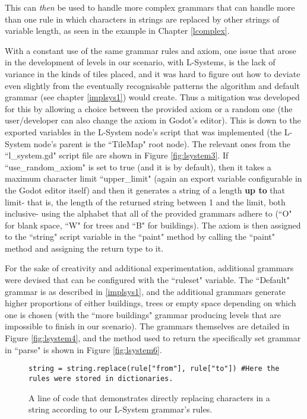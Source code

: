 This can \textit{then} be used to handle more complex grammars that can handle more than one rule in which characters in strings are replaced by other strings of variable length, as seen in the example in Chapter \ref{lcomplex}.

With a constant use of the same grammar rules and axiom, one issue that arose in the development of levels in our scenario, with L-Systems, is the lack of variance in the kinds of tiles placed, and it was hard to figure out how to deviate even slightly from the eventually recognisable patterns the algorithm and default grammar (see chapter \ref{implsys1}) would create. Thus a mitigation was developed for this by allowing a choice between the provided axiom or a random one (the user/developer can also change the axiom in Godot's editor). This is down to the exported variables in the L-System node's script that was implemented (the L-System node's parent is the ``TileMap" root node). The relevant ones from the ``l\_system.gd" script file are shown in Figure \ref{fig:lsystem3}. If ``use\_random\_axiom" is set to true (and it is by default), then it takes a maximum character limit ``upper\_limit" (again an export variable configurable in the Godot editor itself) and then it generates a string of a length \textbf{up to} that limit- that is, the length of the returned string between 1 and the limit, both inclusive- using the alphabet that all of the provided grammars adhere to (``O" for blank space, ``W" for trees and ``B" for buildings). The axiom is then assigned to the ``string" script variable in the ``paint" method by calling the ``paint" method and assigning the return type to it.

For the sake of creativity and additional experimentation, additional grammars were devised that can be configured with the ``ruleset" variable. The ``Default" grammar is as described in \ref{implsys1}, and the additional grammars generate higher proportions of either buildings, trees or empty space depending on which one is chosen (with the ``more buildings" grammar producing levels that are impossible to finish in our scenario). The grammars themselves are detailed in Figure \ref{fig:lsystem4}, and the method used to return the specifically set grammar in ``parse" is shown in Figure \ref{fig:lsystem6}.

\begin{figure}[H]
    \centering
    \begin{lstlisting}
string = string.replace(rule["from"], rule["to"]) #Here the rules were stored in dictionaries.
    \end{lstlisting}
    \caption{A line of code that demonstrates directly replacing characters in a string according to our L-System grammar's rules.}
    \label{fig:lsystem1}
\end{figure}

